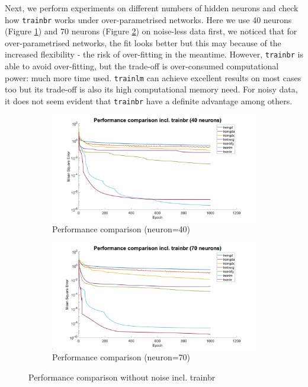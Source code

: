 \documentclass{article}
\begin{document}
Next, we perform experiments on different numbers of hidden neurons and check how \verb|trainbr| works under over-parametrised networks. Here we use 40 neurons (Figure \ref{fig:br40}) and 70 neurons (Figure \ref{fig:br70}) on noise-less data first, we noticed that for over-parametrised networks, the fit looks better but this may because of the increased flexibility - the risk of over-fitting in the meantime. However, \verb|trainbr| is able to avoid over-fitting, but the trade-off is over-consumed computational power: much more time used. \verb|trainlm| can achieve excellent results on most cases too but its trade-off is also its high computational memory need. For noisy data, it does not seem evident that \verb|trainbr| have a definite advantage among others.


\begin{figure}[h!]
\begin{subfigure}[b]{.49\textwidth}
  \centering
  \includegraphics[width=\linewidth]{lab1/trainbr40.pdf}
  \caption{Performance comparison (neuron=40)}
  \label{fig:br40}
\end{subfigure}
\hfill
\begin{subfigure}[b]{.49\textwidth}
  \centering
  \includegraphics[width=\linewidth]{lab1/trainbr70.pdf}
  \caption{Performance comparison (neuron=70)}
  \label{fig:br70}
\end{subfigure}
\caption{Performance comparison without noise incl. trainbr}
\label{fig:fig}
\end{figure}
\end{document}
